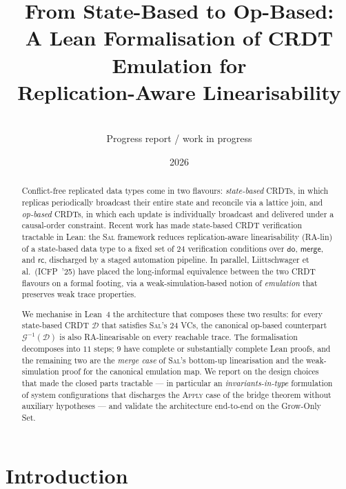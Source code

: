\documentclass[11pt,a4paper]{article}
\title{From State-Based to Op-Based:\\
  A Lean Formalisation of CRDT Emulation for\\
  Replication-Aware Linearisability}
\author{\\[-1em]\small Progress report / work in progress}
\date{2026}
\theoremstyle{definition}
\theoremstyle{remark}
\newcommand{\RDT}{\ensuremath{\mathcal{D}}}
\newcommand{\mdo}{\mathsf{do}}
\newcommand{\mmerge}{\mathsf{merge}}
\newcommand{\mrc}{\mathsf{rc}}
\newcommand{\Sal}{\textsc{Sal}}
\newcommand{\Emul}{\mathcal{G}}
\begin{document}
\maketitle

\begin{abstract}
  Conflict-free replicated data types come in two flavours:
  \emph{state-based} CRDTs, in which replicas periodically broadcast
  their entire state and reconcile via a lattice join, and
  \emph{op-based} CRDTs, in which each update is individually broadcast
  and delivered under a causal-order constraint. Recent work has made
  state-based CRDT verification tractable in Lean: the \Sal{}
  framework reduces replication-aware linearisability (RA-lin) of a
  state-based data type to a fixed set of $24$ verification
  conditions over $\mdo$, $\mmerge$, and $\mrc$, discharged by a staged
  automation pipeline. In parallel, Liittschwager et al.\ (ICFP~'25)
  have placed the long-informal equivalence between the two CRDT
  flavours on a formal footing, via a weak-simulation-based notion of
  \emph{emulation} that preserves weak trace properties.

  We mechanise in Lean~4 the architecture that composes these two
  results: for every state-based CRDT $\RDT$ that satisfies \Sal{}'s
  $24$ VCs, the canonical op-based counterpart $\Emul^{-1}(\RDT)$ is
  also RA-linearisable on every reachable trace. The formalisation
  decomposes into $11$ steps; $9$ have complete or substantially
  complete Lean proofs, and the remaining two are the \emph{merge
  case} of \Sal{}'s bottom-up linearisation and the weak-simulation
  proof for the canonical emulation map. We report on the design
  choices that made the closed parts tractable --- in particular an
  \emph{invariants-in-type} formulation of system configurations that
  discharges the \textsc{Apply} case of the bridge theorem without
  auxiliary hypotheses --- and validate the architecture end-to-end
  on the Grow-Only Set.
\end{abstract}

\section{Introduction}
\label{sec:intro}
\end{document}

